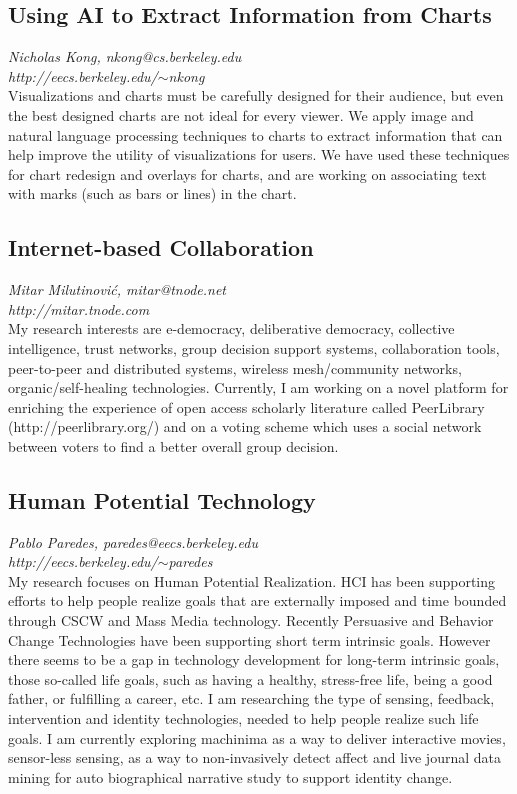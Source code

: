 \documentclass[foldmark,10pt,a4paper,notumble]{leaflet}
\begin{document}
\subsection{Using AI to Extract Information from Charts}
\emph{Nicholas Kong, nkong@cs.berkeley.edu}\\
\emph{http://eecs.berkeley.edu/$\sim$nkong}\\
Visualizations and charts must be carefully designed for their audience, but even the best designed charts are not ideal for every viewer. We apply image and natural language processing techniques to charts to extract information that can help improve the utility of visualizations for users. We have used these techniques for chart redesign and overlays for charts, and are working on associating text with marks (such as bars or lines) in the chart.

\subsection{Internet-based Collaboration}
\emph{Mitar Milutinovi\'c, mitar@tnode.net}\\
\emph{http://mitar.tnode.com}\\
My research interests are e-democracy, deliberative democracy,
collective intelligence, trust networks, group decision support systems,
collaboration tools, peer-to-peer and distributed systems, wireless
mesh/community networks, organic/self-healing technologies. Currently, I
am working on a novel platform for enriching the experience of open
access scholarly literature called PeerLibrary (http://peerlibrary.org/)
and on a voting scheme which uses a social network between voters to
find a better overall group decision.

\subsection{Human Potential Technology}
\emph{Pablo Paredes, paredes@eecs.berkeley.edu}\\
\emph{http://eecs.berkeley.edu/$\sim$paredes}\\
My research focuses on Human Potential Realization. HCI has been supporting efforts to help people realize goals that are externally imposed and time bounded through CSCW and Mass Media technology. Recently Persuasive and Behavior Change Technologies have been supporting short term intrinsic goals. However there seems to be a gap in technology development for long-term intrinsic goals, those so-called life goals, such as having a healthy, stress-free life, being a good father, or fulfilling a career, etc. I am researching the type of sensing, feedback, intervention and identity technologies, needed to help people realize such life goals. I am currently exploring machinima as a way to deliver interactive movies, sensor-less sensing, as a way to non-invasively detect affect and live journal data mining for auto biographical narrative study to support identity change.
\end{document}
